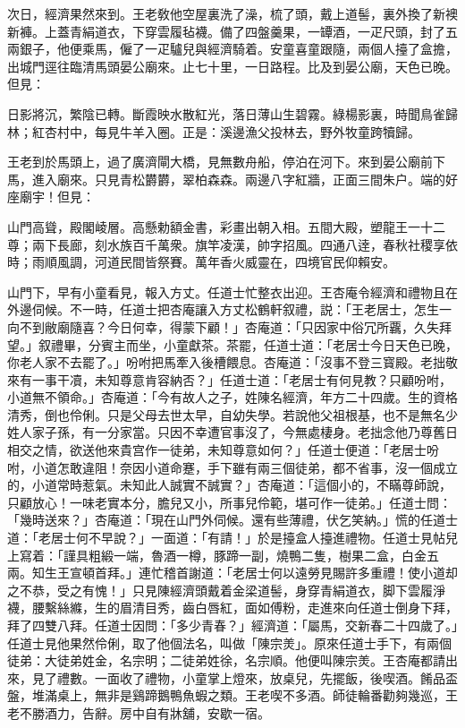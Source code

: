 次日，經濟果然來到。王老敎他空屋裏洗了澡，梳了頭，戴上道髻，裏外換了新襖新褲。上蓋青絹道衣，下穿雲履毡襪。備了四盤羹果，一罈酒，一疋尺頭，封了五兩銀子，他便乘馬，僱了一疋驢兒與經濟騎着。安童喜童跟隨，兩個人擡了盒擔，出城門逕往臨清馬頭晏公廟來。止七十里，一日路程。比及到晏公廟，天色已晚。但見：

日影將沉，繁陰已轉。斷霞映水散紅光，落日薄山生碧霧。綠楊影裏，時聞鳥雀歸林；紅杏村中，每見牛羊入圈。正是：溪邊漁父投林去，野外牧童跨犢歸。

王老到於馬頭上，過了廣濟閘大橋，見無數舟船，停泊在河下。來到晏公廟前下馬，進入廟來。只見青松欝欝，翠柏森森。兩邊八字紅牆，正面三間朱户。端的好座廟宇！但見：

山門高聳，殿閣崚層。高懸勅額金書，彩畫出朝入相。五間大殿，塑龍王一十二尊；兩下長廊，刻水族百千萬衆。旗竿凌漢，帥字招風。四通八逹，春秋社稷享依時；雨順風調，河道民間皆祭賽。萬年香火威靈在，四境官民仰賴安。

山門下，早有小童看見，報入方丈。任道士忙整衣出迎。王杏庵令經濟和禮物且在外邊伺候。不一時，任道士把杏庵讓入方丈松鶴軒叙禮，説：「王老居士，怎生一向不到敝廟隨喜？今日何幸，得蒙下顧！」杏庵道：「只因家中俗冗所覊，久失拜望。」叙禮畢，分賓主而坐，小童獻茶。茶罷，任道士道：「老居士今日天色已晚，你老人家不去罷了。」吩咐把馬牽入後槽餵息。杏庵道：「沒事不登三寳殿。老拙敬來有一事干凟，未知尊意肯容納否？」任道士道：「老居士有何見教？只顧吩咐，小道無不領命。」杏庵道：「今有故人之子，姓陳名經濟，年方二十四歲。生的資格清秀，倒也伶俐。只是父母去世太早，自幼失學。若說他父祖根基，也不是無名少姓人家子孫，有一分家當。只因不幸遭官事沒了，今無處棲身。老拙念他乃尊舊日相交之情，欲送他來貴宫作一徒弟，未知尊意如何？」任道士便道：「老居士吩咐，小道怎敢違阻！奈因小道命蹇，手下雖有兩三個徒弟，都不省事，沒一個成立的，小道常時惹氣。未知此人誠實不誠實？」杏庵道：「這個小的，不瞞尊師說，只顧放心！一味老實本分，膽兒又小，所事兒伶範，堪可作一徒弟。」任道士問：「幾時送來？」杏庵道：「現在山門外伺候。還有些薄禮，伏乞笑納。」慌的任道士道：「老居士何不早說？」一面道：「有請！」於是擡盒人擡進禮物。任道士見帖兒上寫着：「謹具粗緞一端，魯酒一樽，豚蹄一副，燒鴨二隻，樹果二盒，白金五兩。知生王宣頓首拜。」連忙稽首謝道：「老居士何以遠勞見賜許多重禮！使小道却之不恭，受之有愧！」只見陳經濟頭戴着金梁道髻，身穿青絹道衣，脚下雲履淨襪，腰繫絲縧，生的眉清目秀，齒白唇紅，面如傅粉，走進來向任道士倒身下拜，拜了四雙八拜。任道士因問：「多少青春？」經濟道：「屬馬，交新春二十四歲了。」任道士見他果然伶俐，取了他個法名，叫做「陳宗羙」。原來任道士手下，有兩個徒弟：大徒弟姓金，名宗明；二徒弟姓徐，名宗順。他便叫陳宗羙。王杏庵都請出來，見了禮數。一面收了禮物，小童掌上燈來，放桌兒，先擺飯，後喫酒。餚品盃盤，堆滿桌上，無非是鷄蹄鵝鴨魚蝦之類。王老喫不多酒。師徒輪番勸夠幾巡，王老不勝酒力，告辭。房中自有牀舖，安歇一宿。

